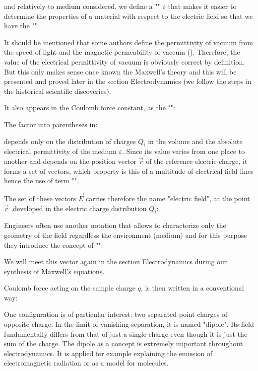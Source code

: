 	and relatively to medium considered, we define a "" $\varepsilon$ that makes it easier to determine the properties of a material with respect to the electric field so that we have the "":
	
	It should be mentioned that some authors define the permittivity of vacuum from the speed of light and the magnetic permeability of vaccum (). Therefore, the value of the electrical permittivity of vacuum is obviously correct by definition. But this only makes sense once known the Maxwell's theory and this will be presented and proved later in the section Electrodynamics (we follow the steps in the historical scientific discoveries).
	
	 It also appears in the Coulomb force constant, as the "":
	  
	The factor into parentheses in:
	
	depends only on the distribution of charges $Q_i$ in the volume and the absolute electrical permittivity of the medium $\varepsilon$. Since its value varies from one place to another and depends on the position vector $\vec{r}$ of the reference electric charge, it forms a set of vectors, which property is this of a multitude of electrical field lines hence the use of term "".
	
	The set of these vectors $\vec{E}$ carries therefore the name "electric field", at the point $\vec{r}$ ,developed in the electric charge distribution $Q_i$:
	
	Engineers often use another notation that allows to characterize only the geometry of the field regardless the environment (medium) and for this purpose they introduce the concept of "":
	
	We will meet this vector again in the section Electrodynamics during our synthesis of Maxwell's equations.
	
	Coulomb force acting on the sample charge $q$, is then written in a conventional way:
	
	One configuration is of particular interest: two separated point charges of opposite charge. In the limit of vanishing separation, it is named "dipole". Its field fundamentally differs from that of just a single charge even though it is just the sum of the charge. The dipole as a concept is extremely important throughout electrodynamics. It is applied for example explaining the emission of electromagnetic radiation or as a model for molecules.
	
